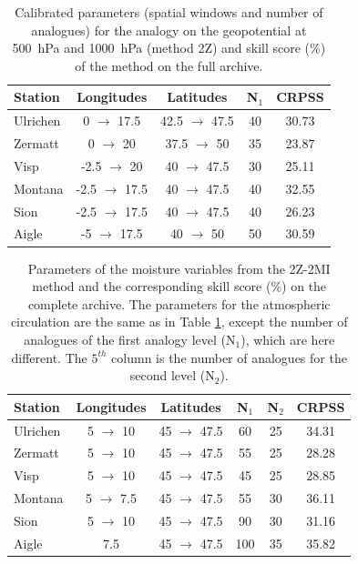 \documentclass[hess]{copernicus}
\begin{document}
\begin{table}[htb]
	\caption{Calibrated parameters (spatial windows and number of analogues) for the analogy on the geopotential at 500~hPa and 1000~hPa (method 2Z) and skill score (\%) of the method on the full archive.}
	\begin{center}
		\begin{tabular}{l c c c c }
			\hline
			Station & Longitudes & Latitudes & N$_{1}$ & CRPSS \\
			\hline
			Ulrichen & 0 $\rightarrow$ 17.5 & 42.5 $\rightarrow$ 47.5 & 40 & 30.73 \\
			Zermatt & 0 $\rightarrow$ 20 & 37.5 $\rightarrow$ 50 & 35 & 23.87 \\
			Visp & -2.5 $\rightarrow$ 20 & 40 $\rightarrow$ 47.5 & 30 & 25.11 \\
			Montana & -2.5 $\rightarrow$ 17.5 & 40 $\rightarrow$ 47.5 & 40 & 32.55 \\
			Sion & -2.5 $\rightarrow$ 17.5 & 40 $\rightarrow$ 47.5 & 40 & 26.23 \\
			Aigle & -5 $\rightarrow$ 17.5 & 40 $\rightarrow$ 50 & 50 & 30.59 \\ 
			\hline
		\end{tabular}
	\end{center}
	\label{table:params_2Z}
\end{table}

\begin{table}[htb]
	\caption{Parameters of the moisture variables from the 2Z-2MI method and the corresponding skill score (\%) on the complete archive. The parameters for the atmospheric circulation are the same as in Table \ref{table:params_2Z}, except the number of analogues of the first analogy level (N$_{1}$), which are here different. The $5^{th}$ column is the number of analogues for the second level (N$_{2}$).}
	\begin{center}
		\begin{tabular}{l c c c c c }
			\hline
			Station & Longitudes & Latitudes & N$_{1}$ & N$_{2}$ & CRPSS \\
			\hline
			Ulrichen & 5 $\rightarrow$ 10 & 45 $\rightarrow$ 47.5 & 60 & 25 & 34.31 \\
			Zermatt & 5 $\rightarrow$ 10 & 45 $\rightarrow$ 47.5 & 55 & 25 & 28.28 \\
			Visp & 5 $\rightarrow$ 10 & 45 $\rightarrow$ 47.5 & 45 & 25 & 28.85 \\
			Montana & 5 $\rightarrow$ 7.5 & 45 $\rightarrow$ 47.5 & 55 & 30 & 36.11 \\
			Sion & 5 $\rightarrow$ 10 & 45 $\rightarrow$ 47.5 & 90 & 30 & 31.16 \\
			Aigle & 7.5 & 45 $\rightarrow$ 47.5 & 100 & 35 & 35.82 \\ 
			\hline
		\end{tabular}
	\end{center}
	\label{table:params_2Z-2MI}
\end{table}
\end{document}
